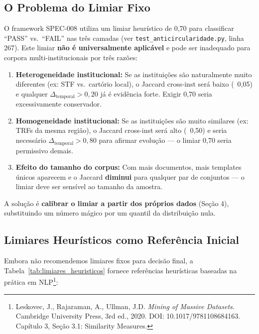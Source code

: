 \documentclass[12pt,a4paper]{article}
\theoremstyle{remark}
\begin{document}
\subsection{O Problema do Limiar Fixo}

O framework SPEC-008 utiliza um limiar heurístico de 0,70 para classificar ``PASS'' vs.\ ``FAIL'' nas três camadas (ver \texttt{test\_anticircularidade.py}, linha 267). Este limiar \textbf{não é universalmente aplicável} e pode ser inadequado para corpora multi-institucionais por três razões:

\begin{enumerate}[label=(\roman*), nosep]
  \item \textbf{Heterogeneidade institucional:} Se as instituições são naturalmente muito diferentes (ex: STF vs.\ cartório local), o Jaccard cross-inst será baixo (~0,05) e qualquer $\Delta_{\text{temporal}} > 0,20$ já é evidência forte. Exigir 0,70 seria excessivamente conservador.
  \item \textbf{Homogeneidade institucional:} Se as instituições são muito similares (ex: TRFs da mesma região), o Jaccard cross-inst será alto (~0,50) e seria necessário $\Delta_{\text{temporal}} > 0,80$ para afirmar evolução — o limiar 0,70 seria permissivo demais.
  \item \textbf{Efeito do tamanho do corpus:} Com mais documentos, mais templates únicos aparecem e o Jaccard \textbf{diminui} para qualquer par de conjuntos — o limiar deve ser sensível ao tamanho da amostra.
\end{enumerate}

A solução é \textbf{calibrar o limiar a partir dos próprios dados} (Seção 4), substituindo um número mágico por um quantil da distribuição nula.

\subsection{Limiares Heurísticos como Referência Inicial}

Embora não recomendemos limiares fixos para decisão final, a Tabela~\ref{tab:limiares_heuristicos} fornece referências heurísticas baseadas na prática em NLP\footnote{Leskovec, J., Rajaraman, A., Ullman, J.D. \textit{Mining of Massive Datasets}. Cambridge University Press, 3rd ed., 2020. DOI: 10.1017/9781108684163. Capítulo 3, Seção 3.1: Similarity Measures.}:
\end{document}
